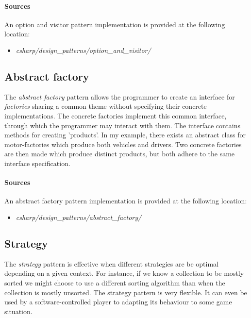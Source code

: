 \documentclass{article}
\begin{document}
\begin{samepage}
  \paragraph{Sources}
  An option and visitor pattern implementation is provided at the following location:
  \begin{itemize}
  \item{{\em csharp/design\_patterns/option\_and\_visitor/}}
  \end{itemize}
\end{samepage}


\subsection{Abstract factory}
The {\em abstract factory} pattern allows the programmer to create an interface for {\em factories} sharing a common
theme without specifying their concrete implementations. The concrete factories implement this common interface, through
which the programmer may interact with them. The interface contains methods for creating 'products'. In my example, there
exists an abstract class for motor-factories which produce both vehicles and drivers. Two concrete factories are then
made which produce distinct products, but both adhere to the same interface specification.

\begin{samepage}
  \paragraph{Sources}
  An abstract factory pattern implementation is provided at the following location:
  \begin{itemize}
  \item{{\em csharp/design\_patterns/abstract\_factory/}}
  \end{itemize}
\end{samepage}


\subsection{Strategy}
The {\em strategy} pattern is effective when different strategies are be optimal depending on a given context. For instance,
if we know a collection to be mostly sorted we might choose to use a different sorting algorithm than when the collection is
mostly unsorted. The strategy pattern is very flexible. It can even be used by a software-controlled player to adapting its
behaviour to some game situation.
\end{document}
